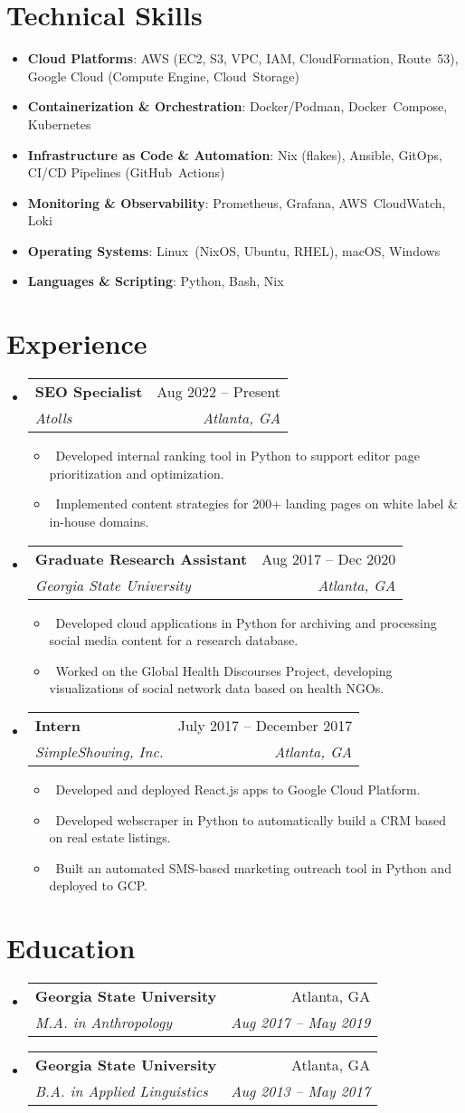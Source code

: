 \documentclass[letterpaper,10pt]{article}
\makeatletter
\newcommand{\resumeItem}[1]{
\item\small{#1}}
\newcommand{\resumeSubheading}[4]{
  \vspace{-1pt}
\item
  \begin{tabular*}{0.97\textwidth}[t]{l@{\extracolsep{\fill}}r}
    \textbf{#1} & #2 \\
    \textit{#3} & \textit{#4} \\
  \end{tabular*}\vspace{-7pt}
}
\newcommand{\resumeSubHeadingList}{
\begin{itemize}[leftmargin=0.15in, label={}]}
\newcommand{\resumeSubHeadingListEnd}{
  \end{itemize}}
\makeatother
\begin{document}
\section{Technical Skills}
\resumeSubHeadingList
\resumeItem{\textbf{Cloud Platforms}: AWS (EC2, S3, VPC, IAM,
CloudFormation, Route 53), Google Cloud (Compute Engine, Cloud Storage)}
\resumeItem{\textbf{Containerization \& Orchestration}:
Docker/Podman, Docker Compose, Kubernetes}
\resumeItem{\textbf{Infrastructure as Code \& Automation}: Nix
(flakes), Ansible, GitOps, CI/CD Pipelines (GitHub Actions)}
\resumeItem{\textbf{Monitoring \& Observability}: Prometheus,
Grafana, AWS CloudWatch, Loki}
\resumeItem{\textbf{Operating Systems}: Linux (NixOS, Ubuntu, RHEL),
macOS, Windows}
\resumeItem{\textbf{Languages \& Scripting}: Python, Bash, Nix}
\resumeSubHeadingListEnd


\section{Experience}
\resumeSubHeadingList
\resumeSubheading
{SEO Specialist}{Aug 2022 -- Present}
{Atolls}{Atlanta, GA}
\resumeSubHeadingList
\resumeItem{\textbullet\ Developed internal ranking tool in Python to
support editor page prioritization and optimization.}
\resumeItem{\textbullet\ Implemented content strategies for 200+
landing pages on white label \& in-house domains.}
\resumeSubHeadingListEnd
\resumeSubheading
{Graduate Research Assistant}{Aug 2017 -- Dec 2020}
{Georgia State University}{Atlanta, GA}
\resumeSubHeadingList
\resumeItem{\textbullet\ Developed cloud applications in Python for
archiving and processing social media content for a research database.}
\resumeItem{\textbullet\ Worked on the Global Health Discourses
Project, developing visualizations of social network data based on health NGOs.}
\resumeSubHeadingListEnd
\resumeSubheading
{Intern}{July 2017 -- December 2017}
{SimpleShowing, Inc.}{Atlanta, GA}
\resumeSubHeadingList
\resumeItem{\textbullet\ Developed and deployed React.js apps to
Google Cloud Platform.}
\resumeItem{\textbullet\ Developed webscraper in Python to
automatically build a CRM based on real estate listings.}
\resumeItem{\textbullet\ Built an automated SMS-based marketing
outreach tool in Python and deployed to GCP.}
\resumeSubHeadingListEnd
\resumeSubHeadingListEnd

\section{Education}
\resumeSubHeadingList
\resumeSubheading
{Georgia State University}{Atlanta, GA}
{M.A. in Anthropology}{Aug 2017 -- May 2019}
\resumeSubheading
{Georgia State University}{Atlanta, GA}
{B.A. in Applied Linguistics}{Aug 2013 -- May 2017}
\resumeSubHeadingListEnd
\end{document}
